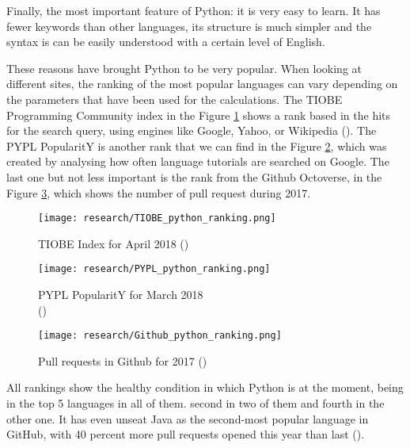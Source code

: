 Finally, the most important feature of Python: it is very easy to learn. It has fewer keywords than other languages, its structure is much simpler and the syntax is can be easily understood with a certain level of English. 

These reasons have brought Python to be very popular. When looking at different sites, the ranking of the most popular languages can vary depending on the parameters that have been used for the calculations. The TIOBE Programming Community index in the Figure \ref{fig:tiobe_rank} shows a rank based in the hits for the search query, using engines like Google, Yahoo, or Wikipedia (\cite{tiobe_index_def}). The PYPL PopularitY is another rank that we can find in the Figure \ref{fig:pypl_rank}, which was created by analysing how often language tutorials are searched on Google. The last one but not less important is the rank from the Github Octoverse, in the Figure \ref{fig:github_octoverse_rank}, which shows the number of pull request during 2017.

\begin{figure}[!ht]
	\centering
	\vspace{0.5cm}
	\texttt{[image: research/TIOBE\_python\_ranking.png]}
	\caption{TIOBE Index for April 2018 (\cite{tiobe_index})}
	\label{fig:tiobe_rank}
\end{figure}

\begin{figure}[!ht]
	\centering
	\texttt{[image: research/PYPL\_python\_ranking.png]}
	\caption{PYPL PopularitY for March 2018 \\(\cite{pypl_pop_rank})}
	\label{fig:pypl_rank}
\end{figure}

\begin{figure}[!ht]
	\centering
	\texttt{[image: research/Github\_python\_ranking.png]}
	\caption{Pull requests in Github for 2017 (\cite{octoverse_2017})}
	\label{fig:github_octoverse_rank}
\end{figure}

All rankings show the healthy condition in which Python is at the moment, being in the top 5 languages in all of them. second in two of them and fourth in the other one. It has even unseat Java as the second-most popular language in GitHub, with 40 percent more pull requests opened this year than last (\cite{octoverse_2017}). 